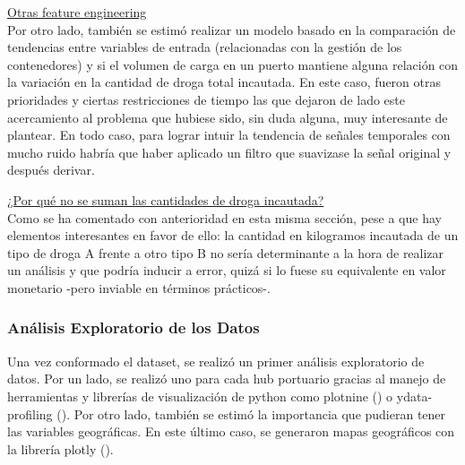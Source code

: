 \documentclass[12pt]{article}
\begin{document}
		
		\underline{Otras feature engineering}\\
		Por otro lado, también se estimó realizar un modelo basado en la comparación de tendencias entre variables de entrada (relacionadas con la gestión de los contenedores) y si el volumen de carga en un puerto mantiene alguna relación con la variación en la cantidad de droga total incautada. En este caso, fueron otras prioridades y ciertas restricciones de tiempo las que dejaron de lado este acercamiento al problema que hubiese sido, sin duda alguna, muy interesante de plantear. En todo caso, para lograr intuir la tendencia de señales temporales con mucho ruido habría que haber aplicado un filtro que suavizase la señal original y después derivar.
		
		\underline{¿Por qué no se suman las cantidades de droga incautada?}\\
		Como se ha comentado con anterioridad en esta misma sección, pese a que hay elementos interesantes en favor de ello: la cantidad en kilogramos incautada de un tipo de droga A frente a otro tipo B no sería determinante a la hora de realizar un análisis y que podría inducir a error, quizá si lo fuese su equivalente en valor monetario -pero inviable en términos prácticos-.
		
		\subsubsection{\label{EDA}Análisis Exploratorio de los Datos}
		Una vez conformado el dataset, se realizó un primer análisis exploratorio de datos. Por un lado, se realizó uno para cada hub portuario gracias al manejo de herramientas y librerías de visualización de python como plotnine (\cite{plotnine2025}) o ydata-profiling (\cite{ydata2025profiling}). Por otro lado, también se estimó la importancia que pudieran tener las variables geográficas. En este último caso, se generaron mapas geográficos con la librería plotly (\cite{plotly2025python}).
\end{document}
